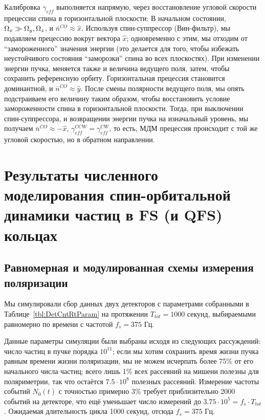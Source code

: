 \documentclass{report}
\newcommand{\vp}[2]{{#1}\cdot 10^{#2}}
\begin{document}
Калибровка $\gamma_{eff}$ выполняется напрямую, через восстановление угловой скорости прецессии спина в горизонтальной плоскости:
В начальном состоянии, $\Omega_x\gg \Omega_y, \Omega_z$, и $\bar n^{CO}\approx \hat x$. Используя спин-суппрессор (Вин-фильтр), мы подавляем прецессию вокруг вектора $\hat x$; одновременно с этим, мы отходим от ``замороженного'' значения энергии (это делается для того, чтобы избежать неустойчивого состояния ``заморозки'' спина во всех плоскостях). При изменении энергии пучка, меняется также и величина ведущего поля, затем, чтобы сохранить референсную орбиту. Горизонтальная прецессия становится доминантной, и $\bar n^{CO} \approx \hat y$. После смены полярности ведущего поля, мы опять подстраиваем его величину таким образом, чтобы восстановить условие замороженности спина в горизонтальной плоскости. Тогда, при выключении спин-суппрессора, и возвращении энергии пучка на изначальный уровень, мы получаем $\bar n^{CO} \approx -\hat x$, $\gamma_{eff}^{CCW} = \gamma_{eff}^{CW}$, то есть, МДМ прецессия происходит с той же угловой скоростью, но в обратном направлении. 

\chapter{Результаты численного моделирования спин-орбитальной динамики
  частиц в FS (и QFS) кольцах}

\section{Равномерная и модулированная схемы измерения поляризации}
Мы симулировали сбор данных двух детекторов с параметрами собранными в
Таблице~\ref{tbl:DetCntRtParam} на протяжении $T_{tot}=1000$ секунд,
выбираемыми равномерно по времени с частотой $f_s = 375$ Гц.

Данные параметры симуляции были выбраны исходя из следующих
рассуждений: число частиц в пучке порядка $10^{11}$; если мы хотим
сохранить время жизни пучка равным времени жизни поляризации, мы не
можем исчерпать более 75\% от его начального числа частиц; всего лишь
1\% всех рассеяний на мишени полезны для поляриметрии, так что
остаётся $\vp{7.5}{8}$ полезных рассеяний. Измерение частоты событий
$N_0(t)$ с точностью примерно 3\% требует приблизительно 2000 событий
на детекторе, что ещё уменьшает число измерений до $\vp{3.75}{5}=
f_s\cdot T_{tot}$. Ожидаемая длительность цикла 1000 секунд, отсюда $f_s = 375$ Гц. 
\end{document}
